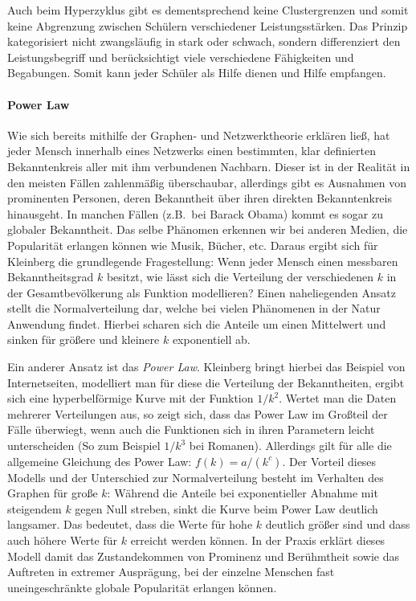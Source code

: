\begin{enumerate}
	Auch beim Hyperzyklus gibt es dementsprechend keine Clustergrenzen und somit keine Abgrenzung zwischen Schülern verschiedener Leistungsstärken.
	Das Prinzip kategorisiert nicht zwangsläufig in stark oder schwach, sondern differenziert den Leistungsbegriff und berücksichtigt viele verschiedene Fähigkeiten und Begabungen.
	Somit kann jeder Schüler als Hilfe dienen und Hilfe empfangen.
\end{enumerate}


\paragraph{Power Law}

Wie sich bereits mithilfe der Graphen- und Netzwerktheorie erklären ließ, hat jeder Mensch innerhalb eines Netzwerks einen bestimmten, klar definierten Bekanntenkreis aller mit ihm verbundenen Nachbarn.
Dieser ist in der Realität in den meisten Fällen zahlenmäßig überschaubar, allerdings gibt es Ausnahmen von prominenten Personen, deren Bekanntheit über ihren direkten Bekanntenkreis hinausgeht.
In manchen Fällen (z.B.\ bei Barack Obama) kommt es sogar zu globaler Bekanntheit.
Das selbe Phänomen erkennen wir bei anderen Medien, die Popularität erlangen können wie Musik, Bücher, etc.
Daraus ergibt sich für Kleinberg die grundlegende Fragestellung:
Wenn jeder Mensch einen messbaren Bekanntheitsgrad $k$ besitzt, wie lässt sich die Verteilung der verschiedenen $k$ in der Gesamtbevölkerung als Funktion modellieren?
Einen naheliegenden Ansatz stellt die Normalverteilung dar, welche bei vielen Phänomenen in der Natur Anwendung findet.
Hierbei scharen sich die Anteile um einen Mittelwert und sinken für größere und kleinere $k$ exponentiell ab.

Ein anderer Ansatz ist das \emph{Power Law}.
Kleinberg bringt hierbei das Beispiel von Internetseiten, modelliert man für diese die Verteilung der Bekanntheiten, ergibt sich eine hyperbelförmige Kurve mit der Funktion $1/ k^2 $.
Wertet man die Daten mehrerer Verteilungen aus, so zeigt sich, dass das Power Law im Großteil der Fälle überwiegt, wenn auch die Funktionen sich in ihren Parametern leicht unterscheiden (So zum Beispiel $1/ k^3$ bei Romanen).
Allerdings gilt für alle die allgemeine Gleichung des Power Law:
$f(k) = a/(k^c)$.
Der Vorteil dieses Modells und der Unterschied zur Normalverteilung besteht im Verhalten des Graphen für große $k$:
Während die Anteile bei exponentieller Abnahme mit steigendem $k$ gegen Null streben, sinkt die Kurve beim Power Law deutlich langsamer.
Das bedeutet, dass die Werte für hohe $k$ deutlich größer sind und dass auch höhere Werte für $k$ erreicht werden können.
In der Praxis erklärt dieses Modell damit das Zustandekommen von Prominenz und Berühmtheit sowie das Auftreten in extremer Ausprägung, bei der einzelne Menschen fast uneingeschränkte globale Popularität erlangen können.

